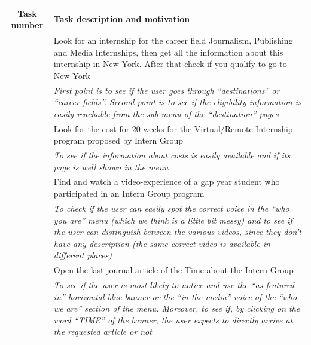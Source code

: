 \documentclass[11pt, letterpaper]{article}
\begin{document}
\begin{table}[H]
    \centering
    \begin{adjustbox}{width=1\textwidth}
    \begin{tabularx}{1\textwidth} { 
        | c 
        | >{\centering\arraybackslash}X | }
            
        \hline \rowcolor{maroon!60}
        Task number & Task description and motivation \\
        
        \hline
        \label{Task:01}
        \multirow{2}{*}{Task 01} & Look for an internship for the career field Journalism, Publishing and Media Internships, then get all the information about this internship in New York. After that check if you qualify to go to New York \\
        \cline{2-2}
        & \textit{First point is to see if the user goes through “destinations” or “career fields”. Second point is to see if the eligibility information is easily reachable from the sub-menu of the “destination” pages} \\
        
        \hline
        \label{Task:02}
        \multirow{2}{*}{Task 02} & Look for the cost for 20 weeks for the Virtual/Remote Internship program proposed by Intern Group \\
        \cline{2-2}
        & \textit{To see if the information about costs is easily available and if its page is well shown in the menu} \\
         
        \hline
        \label{Task:03}
        \multirow{2}{*}{Task 03} & Find and watch a video-experience of a gap year student who participated in an Intern Group program \\
        \cline{2-2}
        & \textit{To check if the user can easily spot the correct voice in the “who you are” menu (which we think is a little bit messy) and to see if the user can distinguish between the various videos, since they don’t have any description (the same correct video is available in different places)} \\
         
        \hline    
        \label{Task:04}
        \multirow{2}{*}{Task 04} & Open the last journal article of the Time about the Intern Group \\
        \cline{2-2}
         & \textit{To see if the user is most likely to notice and use the “as featured in” horizontal blue banner or the “in the media” voice of the “who we are” section of the menu. Moreover, to see if, by clicking on the word “TIME” of the banner, the user expects to directly arrive at the requested article or not} \\
         

\end{tabularx}
\end{adjustbox}
\end{table}
\end{document}
